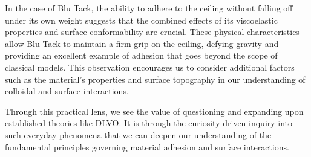 In the case of Blu Tack, the ability to adhere to the ceiling without falling off under its own weight suggests that the combined effects of its viscoelastic properties and surface conformability are crucial. These physical characteristics allow Blu Tack to maintain a firm grip on the ceiling, defying gravity and providing an excellent example of adhesion that goes beyond the scope of classical models. This observation encourages us to consider additional factors such as the material's properties and surface topography in our understanding of colloidal and surface interactions.

Through this practical lens, we see the value of questioning and expanding upon established theories like DLVO. It is through the curiosity-driven inquiry into such everyday phenomena that we can deepen our understanding of the fundamental principles governing material adhesion and surface interactions.


